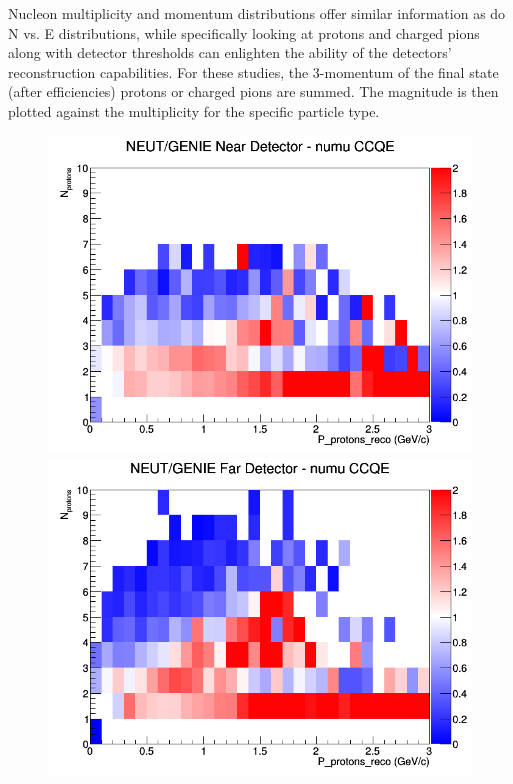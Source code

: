 \documentclass[12pt]{article}
\begin{document}
Nucleon multiplicity and momentum distributions offer similar information as do N vs. E distributions, while specifically looking at protons and charged pions along with detector thresholds can enlighten the ability of the detectors' reconstruction capabilities. For these studies, the 3-momentum of the final state (after efficiencies) protons or charged pions are summed. The magnitude is then plotted against the multiplicity for the specific particle type. 
\begin{figure}[h]
\includegraphics[width=\linewidth]{eff_N_P/FGT/protons/ratios/CCQE_NEUT_GENIE_numu_near_N_P.png}
\endminipage
{}
\includegraphics[width=\linewidth]{eff_N_P/FGT/protons/ratios/CCQE_NEUT_GENIE_numu_far_N_P.png}

\end{figure}
\end{document}

